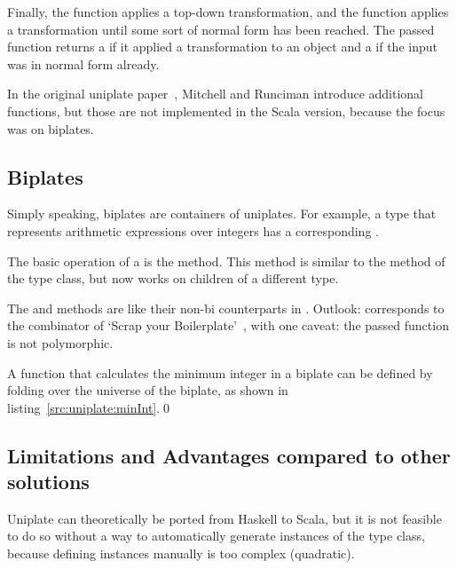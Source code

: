 Finally, the  function applies a top-down transformation, and the  function applies a transformation until some sort of
normal form has been reached. The passed function returns a  if
it applied a transformation to an object and a  if the input was
in normal form already.




In the original uniplate paper~\cite{DBLP:conf/haskell/MitchellR07}, Mitchell
and Runciman introduce additional functions, but those are not implemented
in the Scala version, because the focus was on biplates.

\subsection{Biplates}
Simply speaking, biplates are containers of uniplates. For example, a type
 that represents arithmetic expressions over integers has a corresponding
.



The basic operation of a  is the  method. This method
is similar to the  method of the  type class, but now
works on children of a different type.

The  and  methods are like their non-bi counterparts
in . Outlook:  corresponds to the
 combinator of `Scrap your Boilerplate'~\cite{DBLP:conf/tldi/LammelJ03},
with one caveat: the passed function is not polymorphic.

\begin{example}
A function that calculates the minimum integer in a biplate can be defined
by folding  over the universe of the biplate, as shown
in listing~\ref{src:uniplate:minInt}.\qed



\end{example}

\subsection{Limitations and Advantages compared to other solutions}
Uniplate can theoretically be ported from Haskell to Scala, but it is not
feasible to do so without a way to automatically generate instances of the
 type class, because defining instances manually is too complex
(quadratic).

